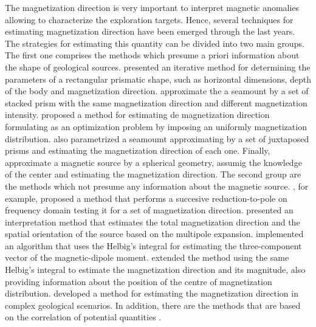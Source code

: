 The magnetization direction is very important to interpret magnetic anomalies allowing to characterize the exploration targets. Hence, several techniques for estimating magnetization direction have been emerged through the last years. The strategies for estimating this quantity can be divided into two main groups. The first one comprises the methods which presume a priori information about the shape of geological sources. \cite{bhattacharyya1966} presented an iterative method for determining the parameters of a rectangular prismatic shape, such as horizontal dimensions, depth of the body and magnetization direction. \cite{emilia_massey_1974} approximate the a seamount by a set of stacked prism with the same magnetization direction and different magnetization intensity. \cite{parker_etal_1987} proposed a method for estimating de magnetization direction formulating as an optimization problem by imposing an uniformly magnetization distribution. \cite{kubota2005} also parametrized a seamoumt approximating by a set of juxtaposed prisms and estimating the magnetization direction of each one. Finally, \cite{oliveirajr_etal_2015} approximate a magnetic source by a spherical geometry, assumig the knowledge of the center and estimating the magnetization direction. The second group are the methods which not presume any information about the magnetic source. \cite{fedi_etal_1994}, for example, proposed a method that performs a succesive reduction-to-pole on frequency domain testing it for a set of magnetization direction. \cite{medeiros_silva_1995} presented an interpretation method that estimates the total magnetization direction and the spatial orientation of the source based on the multipole expansion. \cite{phillips2005} implemented an algorithm that uses the Helbig's integral for estimating the three-component vector of the magnetic-dipole moment. \cite{tontini_pedersen_2008} extended the method using the same Helbig's integral to estimate the magnetization direction and its magnitude, also providing information about the position of the centre of magnetization distribution. \cite{lelievre_oldenburg_2009} developed a method for estimating the magnetization direction in complex geological scenarios. In addition, there are the methods that are based on the correlation of potential quantities \citep{dannemiller_li_2006,gerovska_etal_2009,liu_etal_2015,zhang_etal_2018}.

